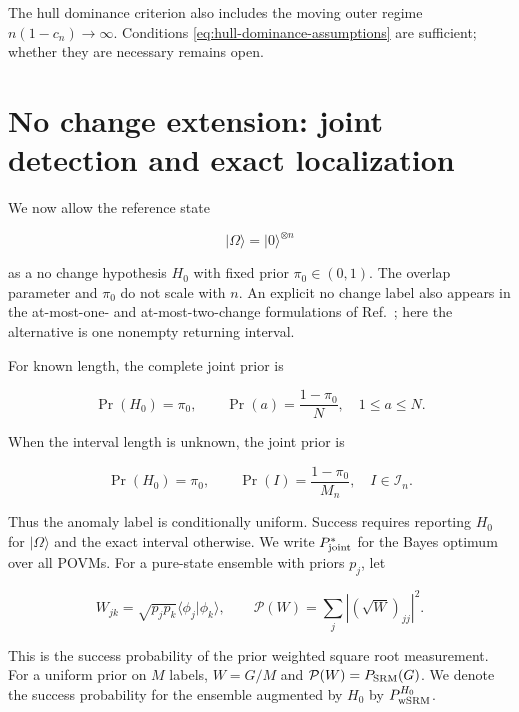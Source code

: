 The hull dominance criterion also includes the moving outer regime
\(n(1-c_n)\to\infty\). Conditions
\eqref{eq:hull-dominance-assumptions} are sufficient; whether they are
necessary remains open.

\section{No change extension: joint detection and exact localization}
\label{joint-detection-and-exact-localization}

We now allow the reference state

\[
 |\Omega\rangle=|0\rangle^{\otimes n}
\]

as a no change hypothesis \(H_0\) with fixed prior
\(\pi_0\in(0,1)\). The overlap parameter and \(\pi_0\) do not scale with
\(n\). An explicit no change label also appears in the at-most-one- and
at-most-two-change formulations of Ref.~\cite{mohan2023}; here the alternative
is one nonempty returning interval.

For known length, the complete joint prior is

\begin{equation}\label{eq:h0-known-joint-prior}
\Pr(H_0)=\pi_0,
\qquad
\Pr(a)=\frac{1-\pi_0}{N},
\quad 1\le a\le N.
\end{equation}

When the interval length is unknown, the joint prior is

\begin{equation}\label{eq:h0-unknown-joint-prior}
\Pr(H_0)=\pi_0,
\qquad
\Pr(I)=\frac{1-\pi_0}{M_n},
\quad I\in\mathcal I_n.
\end{equation}

Thus the anomaly label is conditionally uniform. Success requires reporting
\(H_0\) for \(|\Omega\rangle\) and the exact interval otherwise. We write
\(P_{\rm joint}^*\) for the Bayes optimum over all POVMs. For a pure-state
ensemble with priors \(p_j\), let

\begin{equation}\label{eq:weighted-gram-srm}
W_{jk}=\sqrt{p_jp_k}\langle\phi_j|\phi_k\rangle,
\qquad
\mathcal P(W)=\sum_j\left|(\sqrt W)_{jj}\right|^2.
\end{equation}

This is the success probability of the prior weighted square root measurement.
For a uniform prior on \(M\) labels, \(W=G/M\) and
\(\mathcal P(W)=P_{\rm SRM}(G)\). We denote the success probability for the
ensemble augmented by \(H_0\) by \(P_{\rm wSRM}^{H_0}\).

